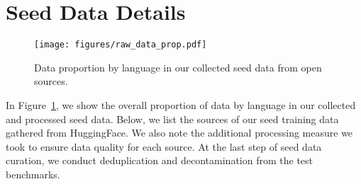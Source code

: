 \section{Seed Data Details}\label{app:data}
\begin{figure}[!ht]
    \centering
    \texttt{[image: figures/raw\_data\_prop.pdf]}
    \caption{Data proportion by language in our collected seed data from open sources.}
    \label{fig:data_prop}
\end{figure}
In Figure~\ref{fig:data_prop}, we show the overall proportion of data by language in our collected and processed seed data. Below, we list the sources of our seed training data gathered from HuggingFace. We also note the additional processing measure we took to ensure data quality for each source. At the last step of seed data curation, we conduct deduplication and decontamination from the test benchmarks.
